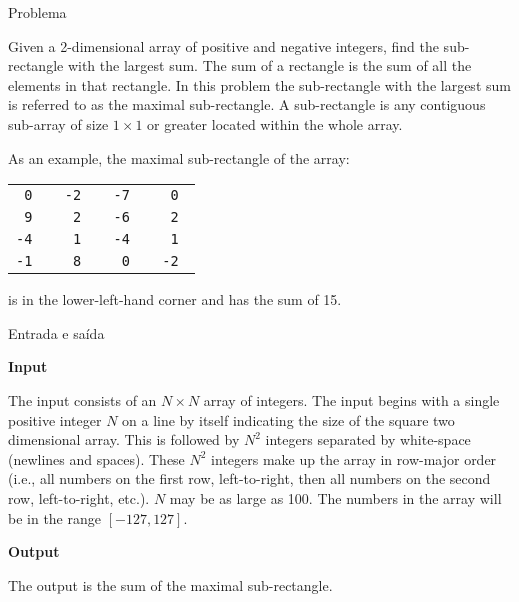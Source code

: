 
\begin{frame}[fragile]{Problema}

Given a 2-dimensional array of positive and negative integers, find the sub-rectangle with the
largest sum. The sum of a rectangle is the sum of all the elements in that rectangle. In this
problem the sub-rectangle with the largest sum is referred to as the maximal sub-rectangle. A
sub-rectangle is any contiguous sub-array of size $1\times 1$ or greater located within the whole
array.

As an example, the maximal sub-rectangle of the array:
    \begin{table}[!ht]
        \begin{tabular}{>{\tt}r>{\tt}r>{\tt}r>{\tt}r}
            0 & -2 & -7 & 0 \\
            \textcolor{blue!60}{9} & \textcolor{blue!60}{2} & -6 & 2 \\
            \textcolor{blue!60}{-4} & \textcolor{blue!60}{1} & -4 & 1 \\
            \textcolor{blue!60}{-1} & \textcolor{blue!60}{8} & 0 & -2 \\
        \end{tabular}
    \end{table}

is in the lower-left-hand corner and has the sum of 15.

\end{frame}

\begin{frame}[fragile]{Entrada e saída}

\textbf{Input}

The input consists of an $N\times N$ array of integers. The input begins with a single positive
integer $N$ on a line by itself indicating the size of the square two dimensional array. This is
followed by $N^2$ integers separated by white-space (newlines and spaces). These $N^2$ integers
make up the array in row-major order (i.e., all numbers on the first row, left-to-right, then all
numbers on the second row, left-to-right, etc.). $N$ may be as large as 100. The numbers in the
array will be in the range $[-127, 127]$.

\vspace{0.2in}

\textbf{Output}

The output is the sum of the maximal sub-rectangle.

\end{frame}


